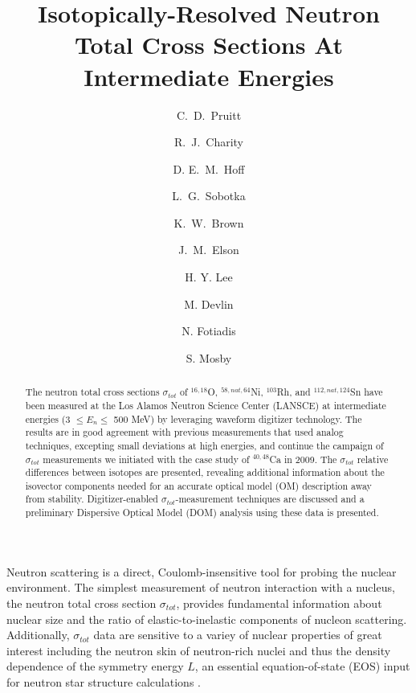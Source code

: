\documentclass[twocolumn,secnumarabic,amssymb, nobibnotes, aps, prl,
superscriptaddress, nobalancelastpage]{revtex4}
\newcommand{\tot}{\ensuremath{\sigma_{tot}}}
\newcommand{\tots}{\ensuremath{\sigma_{tot}}\,\,}
\begin{document}
\begin{abstract}
    The neutron total cross sections \tots of $^{16,18}$O,
    $^{58,nat,64}$Ni, $^{103}$Rh, and $^{112,nat,124}$Sn have been measured at the Los Alamos
    Neutron Science Center (LANSCE) at intermediate energies (3 $\leq E_{n}
    \leq$ 500 MeV) by
    leveraging waveform digitizer technology. The results are in good agreement
    with previous measurements that used analog techniques,
    excepting small deviations at high energies, and continue the campaign of
    \tots measurements we initiated with the case study of $^{40,48}$Ca in 2009.
    The \tots relative differences between isotopes are presented,
    revealing additional information about
    the isovector components needed for an accurate optical model (OM)
    description away from stability. Digitizer-enabled \tot-measurement
    techniques are discussed and a preliminary Dispersive Optical Model (DOM)
    analysis using these data is presented.
\end{abstract}

\title{Isotopically-Resolved Neutron Total Cross Sections At
Intermediate Energies}

\author{C.~D.~Pruitt}  
\author{R.~J.~Charity}
\author{D. E.~M.~Hoff}  
\author{L.~G.~Sobotka}
\author{K.~W.~Brown} 
\author{J.~M.~Elson}

\author{H. Y. Lee}
\author{M. Devlin}
\author{N. Fotiadis}
\author{S. Mosby}
\maketitle

Neutron scattering is a direct, Coulomb-insensitive tool for probing the nuclear
environment. The simplest measurement of neutron interaction with a nucleus,
the neutron total cross section \tot, provides fundamental information about
nuclear size and the ratio of elastic-to-inelastic components of nucleon 
scattering. Additionally, \tots data are sensitive to a variey of nuclear
properties of great interest including the neutron skin of neutron-rich nuclei
\cite{Mahzoon2017} and thus the density dependence of the symmetry energy $L$,
an essential equation-of-state (EOS) input for neutron star
structure calculations \cite{Fattoyev2012, Vinas2014, Brown2000}.
\end{document}

